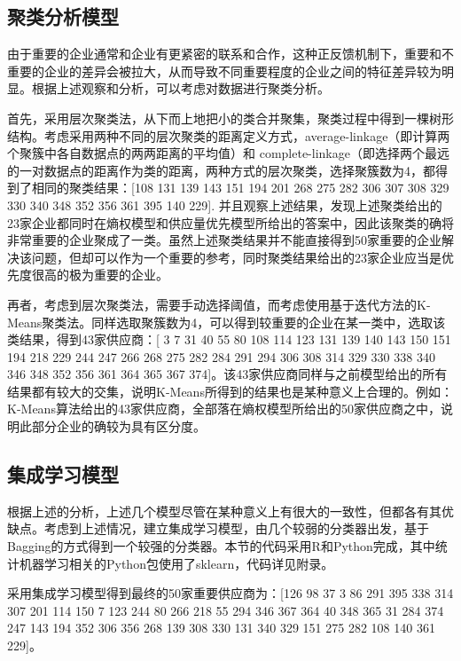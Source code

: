 \documentclass{my_paper}
\begin{document}
\subsection{聚类分析模型}

由于重要的企业通常和企业有更紧密的联系和合作，这种正反馈机制下，重要和不重要的企业的差异会被拉大，从而导致不同重要程度的企业之间的特征差异较为明显。根据上述观察和分析，可以考虑对数据进行聚类分析。

首先，采用层次聚类法\cite{james2013introduction}，从下而上地把小的类合并聚集，聚类过程中得到一棵树形结构。考虑采用两种不同的层次聚类的距离定义方式，average-linkage（即计算两个聚簇中各自数据点的两两距离的平均值）和 complete-linkage（即选择两个最远的一对数据点的距离作为类的距离，两种方式的层次聚类，选择聚簇数为4，都得到了相同的聚类结果：[108 131 139 143 151 194 201 268 275 282 306 307 308 329 330 340 348 352 356 361 395 140 229]. 并且观察上述结果，发现上述聚类给出的23家企业都同时在熵权模型和供应量优先模型所给出的答案中，因此该聚类的确将非常重要的企业聚成了一类。虽然上述聚类结果并不能直接得到50家重要的企业解决该问题，但却可以作为一个重要的参考，同时聚类结果给出的23家企业应当是优先度很高的极为重要的企业。

再者，考虑到层次聚类法，需要手动选择阈值，而考虑使用基于迭代方法的K-Means聚类法。同样选取聚簇数为4，可以得到较重要的企业在某一类中，选取该类结果，得到43家供应商：[  3   7  31  40  55  80 108 114 123 131 139 140 143 150 151 194 218 229 244 247 266 268 275 282 284 291 294 306 308 314 329 330 338 340 346 348 352 356 361 364 365 367 374]。该43家供应商同样与之前模型给出的所有结果都有较大的交集，说明K-Means所得到的结果也是某种意义上合理的。例如：K-Means算法给出的43家供应商，全部落在熵权模型所给出的50家供应商之中，说明此部分企业的确较为具有区分度。

\subsection{集成学习模型}

根据上述的分析，上述几个模型尽管在某种意义上有很大的一致性，但都各有其优缺点。考虑到上述情况，建立集成学习模型，由几个较弱的分类器出发，基于Bagging的方式得到一个较强的分类器。本节的代码采用R和Python完成，其中统计机器学习相关的Python包使用了sklearn，代码详见附录。

采用集成学习模型得到最终的50家重要供应商为：[126  98  37   3  86 291 395 338 314 307 201 114 150   7 123 244  80 266 218  55 294 346 367 364  40 348 365  31 284 374 247 143 194 352 306 356 268 139 308 330 131 340 329 151 275 282 108 140 361 229]。
\end{document}
